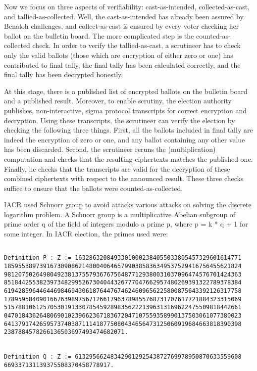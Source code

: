 Now we focus on three aspects of verifiability: cast-as-intended, collected-as-cast, 
and tallied-as-collected. Well, the cast-as-intended has already been assured 
by Benaloh challenges, and collect-as-cast is ensured by every voter 
checking her ballot on the bulletin board. 
The more complicated step is the counted-as-collected
check.  In order to verify the tallied-as-cast, a scrutineer has to check 
only the valid ballots (those which are encryption of either zero or one) 
has contributed to final tally, the final tally has been calculated 
correctly, and the final tally has been decrypted honestly. 

At this stage, there is a published list of encrypted ballots on the bulletin board
and a published result.  Moreover, to enable scrutiny, the election authority publishes, 
non-interactive, sigma protocol transcripts for correct encryption and decryption. 
Using these transcripts,  the scrutineer can verify the election by checking the following
three things. First, all the ballots included in final tally are indeed the encryption of 
zero or one, and any ballot containing any other value has been discarded. 
Second, the scrutineer reruns the (multiplication)
computation and checks that the resulting ciphertexts matches the published one.
Finally, he checks that the transcripts are valid for the decryption of these
combined ciphertexts with respect to the announced result.  These  three checks
suffice to ensure that the ballots were counted-as-collected. 


IACR used Schnorr group to avoid attacks various attacks on solving the discrete 
logarithm problem.  A Schnorr group is a multiplicative Abelian subgroup of prime order q of the field of 
integers modulo a prime p, where p = k * q + 1 for some integer.   In IACR election, 
the primes used were:
\begin{verbatim}

Definition P : Z := 16328632084933010002384055033805457329601614771
1859553897391673090862148004064657990385836349537529416756455621824
9812075026498049238137557936767564877129380031037096474576701424363
8518442553823973482995267304044326777047662957480269391322789378384
6194285964464469846943061876447674624609656225800875643392126317758
1789595840901667639897567126617963789855768731707617721884323315069
5157881061257053019133078545928983562221396313169622475509818442661
0470184362648069010239662367183672047107559358990137503061077380023
6413791742659573740387111418775080434656473125060919684663818390398
2387884578266136503697493474682071.


Definition Q : Z := 61329566248342901292543872769978950870633559608
669337131139375508370458778917.


\end{verbatim}

